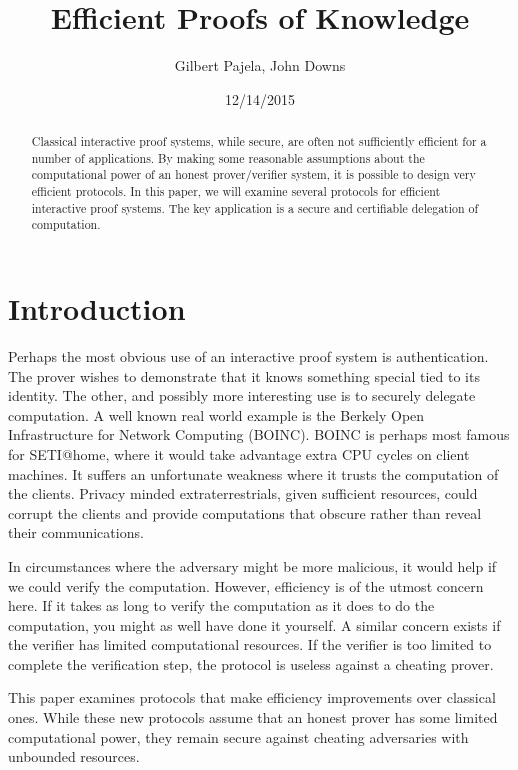 \documentclass{article}
\title{Efficient Proofs of Knowledge}
\author{Gilbert Pajela, John Downs}
\date{12/14/2015}
\begin{document}
\maketitle

\begin{abstract}
  Classical interactive proof systems, while secure, are often not
  sufficiently efficient for a number of applications. By making some
  reasonable assumptions about the computational power of an honest
  prover/verifier system, it is possible to design very efficient
  protocols. In this paper, we will examine several protocols for
  efficient interactive proof systems. The key application is a
  secure and certifiable delegation of computation.
\end{abstract}

\section*{Introduction}

Perhaps the most obvious use of an interactive proof system is
authentication. The prover wishes to demonstrate that it knows
something special tied to its identity. The other, and possibly more
interesting use is to securely delegate computation. A well known real
world example is the Berkely Open Infrastructure for Network Computing
(BOINC). BOINC is perhaps most famous for SETI@home, where it would
take advantage extra CPU cycles on client machines. It suffers an
unfortunate weakness where it trusts the computation of the
clients. Privacy minded extraterrestrials, given sufficient resources,
could corrupt the clients and provide computations that obscure rather
than reveal their communications.

In circumstances where the adversary might be more malicious, it would
help if we could verify the computation. However, efficiency is of the
utmost concern here. If it takes as long to verify the computation as
it does to do the computation, you might as well have done it
yourself. A similar concern exists if the verifier has limited
computational resources. If the verifier is too limited to complete
the verification step, the protocol is useless against a cheating
prover.

This paper examines protocols that make efficiency improvements over
classical ones. While these new protocols assume that an honest prover
has some limited computational power, they remain secure against
cheating adversaries with unbounded resources.
\end{document}
